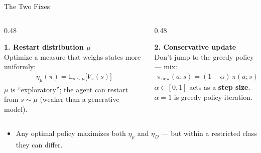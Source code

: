 \documentclass[aspectratio=169]{beamer}
\newcommand{\E}{\mathbb{E}}
\newcommand{\pinew}{\pi_{\mathrm{new}}}
\begin{document}
\begin{frame}{The Two Fixes}
  \begin{columns}[t]
    \begin{column}{0.48\textwidth}
      \begin{warmbox}
        \textbf{\color{AtlasWarm}1. Restart distribution $\mu$}\\[4pt]
        \small Optimize a measure that weighs states more uniformly:
        \begin{gather*}
          \eta_\mu(\pi) = \E_{s\sim\mu}\big[V_\pi(s)\big]
        \end{gather*}
        $\mu$ is ``exploratory''; the agent can restart from $s\sim\mu$ (weaker than a generative model).
      \end{warmbox}
    \end{column}
    \begin{column}{0.48\textwidth}
      \begin{coolbox}
        \textbf{\color{AtlasCool}2. Conservative update}\\[4pt]
        \small Don't jump to the greedy policy --- mix:
        \begin{gather*}
          \pinew(a;s) = (1-\alpha)\,\pi(a;s) + \alpha\,\pi'(a;s)
        \end{gather*}
        $\alpha \in [0,1]$ acts as a \textbf{step size}. $\alpha = 1$ is greedy policy iteration.
      \end{coolbox}
    \end{column}
  \end{columns}

  \vspace{8pt}
  \begin{itemize}
    \item Any optimal policy maximizes both $\eta_\mu$ and $\eta_D$ --- but within a restricted class they can differ.
  \end{itemize}
\end{frame}
\end{document}
